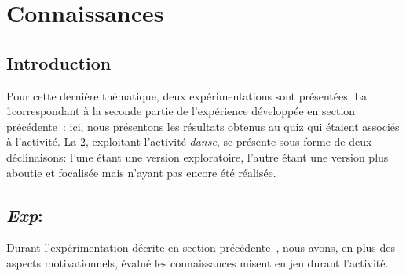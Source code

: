 \clearpage
\section{Connaissances}\label{chap:3.3}
    \subsection{Introduction}
        Pour cette dernière thématique, deux expérimentations sont présentées. La 1\iere correspondant à la seconde partie de l'expérience développée en section précédente~: ici, nous présentons les résultats obtenus au quiz qui étaient associés à l'activité. La 2\nde, exploitant l'activité \textit{danse}, se présente sous forme de deux déclinaisons: l'une étant une version exploratoire, l'autre étant une version plus aboutie et focalisée mais n'ayant pas encore été réalisée.
    \subsection{\textit{Exp}: }\label{Exp:poule_2}
            Durant l'expérimentation décrite en section précédente~, nous avons, en plus des aspects motivationnels, évalué les connaissances misent en jeu durant l'activité.
